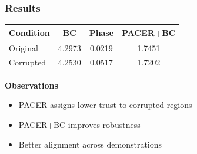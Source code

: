 \begin{frame}
    \frametitle{\textbf{Results}}

    \begin{table}[h]
        \centering
        \small
        \begin{tabular}{lccc}
            \toprule
            Condition & BC & Phase & PACER+BC \\
            \midrule
            Original & 4.2973 & 0.0219 & 1.7451 \\
            Corrupted & 4.2530 & 0.0517 & 1.7202 \\
            \bottomrule
        \end{tabular}
    \end{table}

    \vspace{1em}

    \textbf{Observations}
    \begin{itemize}
        \item PACER assigns lower trust to corrupted regions
        \item PACER+BC improves robustness
        \item Better alignment across demonstrations
    \end{itemize}

\end{frame}
